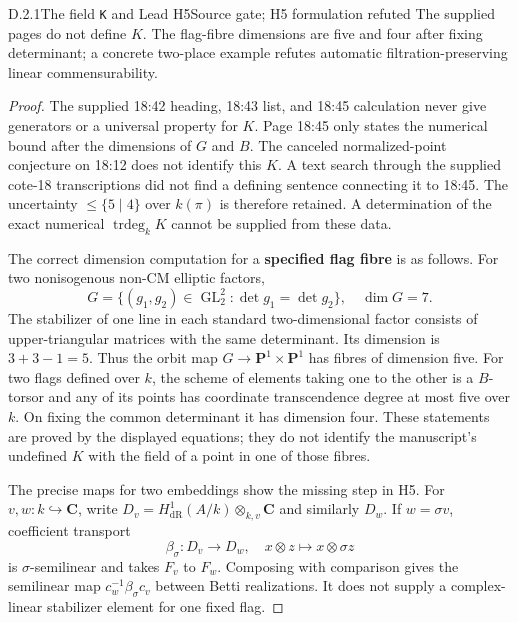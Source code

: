 \begin{result}{D.2.1}{The field \texttt{K} and Lead H5}{Source gate; H5 formulation refuted}
The supplied pages do not define $K$. The flag-fibre dimensions are five and four after fixing determinant; a concrete two-place example refutes automatic filtration-preserving linear commensurability.
\end{result}
\begin{proof}
The supplied 18:42 heading, 18:43 list, and 18:45 calculation never
give generators or a universal property for \(K\). Page 18:45 only
states the numerical bound after the dimensions of \(G\) and \(B\).
The canceled normalized-point conjecture on 18:12 does not identify
this \(K\). A text search through the supplied cote-18
transcriptions did not find a defining sentence connecting it to
18:45. The uncertainty \(\leq\{5\mid4\}\) over \(k(\pi)\) is
therefore retained. A determination of the exact numerical
\(\operatorname{trdeg}_kK\) cannot be supplied from these data.

The correct dimension computation for a \textbf{specified flag fibre} is
as follows. For two nonisogenous non-CM elliptic factors,
\[
G=\{(g_1,g_2)\in\operatorname{GL}_2^2:
\det g_1=\det g_2\},\quad\dim G=7.
\]
The stabilizer of one line in each standard two-dimensional factor
consists of upper-triangular matrices with the same determinant. Its
dimension is \(3+3-1=5\). Thus the orbit map
\(G\to\mathbf P^1\times\mathbf P^1\) has fibres of dimension five.
For two flags defined over \(k\), the scheme of elements taking one
to the other is a \(B\)-torsor and any of its points has coordinate
transcendence degree at most five over \(k\). On fixing the common
determinant it has dimension four. These statements are proved by
the displayed equations; they do not identify the manuscript's
undefined \(K\) with the field of a point in one of those fibres.

The precise maps for two embeddings show the missing step in H5.
For \(v,w:k\hookrightarrow\mathbf C\), write
\(D_v=H^1_{\mathrm{dR}}(A/k)\otimes_{k,v}\mathbf C\) and similarly
\(D_w\). If \(w=\sigma v\), coefficient transport
\[
\beta_\sigma:D_v\longrightarrow D_w,\quad x\otimes z\longmapsto
x\otimes\sigma z
\]
is \(\sigma\)-semilinear and takes \(F_v\) to \(F_w\).
Composing with comparison gives the semilinear map
\(c_w^{-1}\beta_\sigma c_v\) between Betti realizations. It does
not supply a complex-linear stabilizer element for one fixed flag.


\end{proof}
